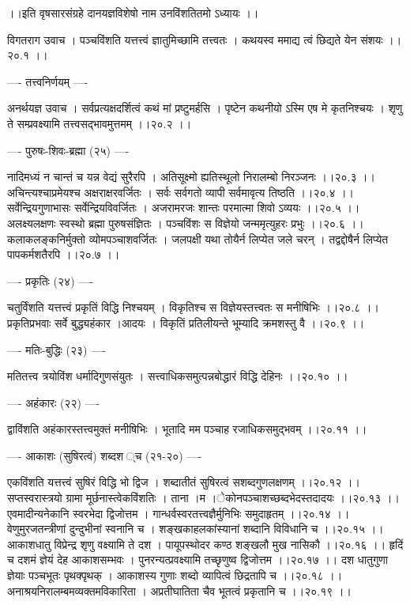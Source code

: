 \documentclass[11pt]{book}
\begin{document}
\begin{landscape}
 ।।इति वृषसारसंग्रहे दानयज्ञविशेषो नाम उनविंशतितमो ऽध्यायः ।।




विगतराग उवाच ।
पञ्चविंशति यत्तत्त्वं ज्ञातुमिच्छामि तत्त्वतः ।
कथयस्व ममाद्य त्वं छिद्यते येन संशयः ।।२०.१ ।।

---- तत्त्वनिर्णयम् ----

अनर्थयज्ञ उवाच ।
सर्वप्रत्यक्षदर्शित्वं कथं मां प्रष्टुमर्हसि ।
पृष्टेन कथनीयो ऽस्मि एष मे कृतनिश्चयः ।
शृणु ते सम्प्रवक्ष्यामि तत्त्वसद्भावमुत्तमम् ।।२०.२ ।।

---- पुरुषः-शिवः-ब्रह्मा (२५) ----

नादिमध्यं न चान्तं च यन्न वेद्यं सुरैरपि ।
अतिसूक्ष्मो ह्यतिस्थूलो निरालम्बो निरञ्जनः ।।२०.३ ।।
अचिन्त्यश्चाप्रमेयश्च अक्षराक्षरवर्जितः ।
सर्वः सर्वगतो व्यापी सर्वमावृत्य तिष्ठति ।।२०.४ ।।
सर्वेन्द्रियगुणाभासः सर्वेन्द्रियविवर्जितः ।
अजरामरजः शान्तः परमात्मा शिवो ऽव्ययः ।।२०.५ ।।
अलक्ष्यलक्षणः स्वस्थो ब्रह्मा पुरुषसंज्ञितः ।
पञ्चविंशः स विज्ञेयो जन्ममृत्युहरः प्रभुः ।।२०.६ ।।
कलाकलङ्कनिर्मुक्तो व्योमपञ्चाशवर्जितः ।
जलपक्षी यथा तोयैर्न लिप्येत जले चरन् ।
तद्वद्दोषैर्न लिप्येत पापकर्मशतैरपि ।।२०.७ ।।

---- प्रकृतिः (२४) ----

चतुर्विंशति यत्तत्त्वं प्रकृतिं विद्धि निश्चयम् ।
विकृतिश्च स विज्ञेयस्तत्त्वतः स मनीषिभिः ।।२०.८ ।।
प्रकृतिप्रभवाः सर्वे बुद्ध्यहंकार ।आदयः ।
विकृतिं प्रतिलीयन्ते भूम्यादि क्रमशस्तु वै ।।२०.९ ।।

---- मतिः-बुद्धिः (२३) ----

मतितत्त्व त्रयोविंश धर्मादिगुणसंयुतः ।
सत्त्वाधिकसमुत्पन्नबोद्धारं विद्धि देहिनः ।।२०.१० ।।

---- अहंकारः (२२) ----

द्वाविंशति अहंकारस्तत्त्वमुक्तं मनीषिभिः ।
भूतादि मम पञ्चाह रजाधिकसमुद्भवम् ।।२०.११ ।।

---- आकाशः (सुषिरत्वं) शब्दश{ }्च (२१-२०) ----

एकविंशति यत्तत्त्वं सुषिरं विद्धि भो द्विज ।
शब्दातीतं सुषिरत्वं सशब्दगुणलक्षणम् ।।२०.१२ ।।
सप्तस्वरास्त्रयो ग्रामा मूर्छनास्त्वेकविंशतिः ।
ताना{ ।}म{ ।}ेकोनपञ्चाशच्छब्दभेदस्तदादयः ।।२०.१३ ।।
एवमादीन्यनेकानि स्वरभेदा द्विजोत्तम ।
गान्धर्वस्वरतत्त्वज्ञैर्मुनिभिः समुदाहृतम् ।।२०.१४ ।।
वेणुमुरजतन्त्रीणां दुन्दुभीनां स्वनानि च ।
शङ्खकाहलकांस्यानां शब्दानि विविधानि च ।।२०.१५ ।।
आकाशधातु विप्रेन्द्र शृणु वक्ष्यामि ते दश ।
पायूपस्थोदर कण्ठ शङ्खलौ मुख नासिकौ ।।२०.१६ ।।
हृदिं च दशमं ज्ञेयं देह आकाशसम्भवः ।
पुनरन्यत्प्रवक्ष्यामि तच्छृणुष्व द्विजोत्तम ।।२०.१७ ।।
दश धातुगुणा ज्ञेयाः पञ्चभूतः पृथक्पृथक् ।
आकाशस्य गुणाः शब्दो व्यापित्वं छिद्रतापि च ।।२०.१८ ।।
अनाश्रयनिरालम्बमव्यक्तमविकारिता ।
अप्रतीघातिता चैव भूतत्वं प्रकृतानि च ।।२०.१९ ।।


\end{landscape}
\end{document}
